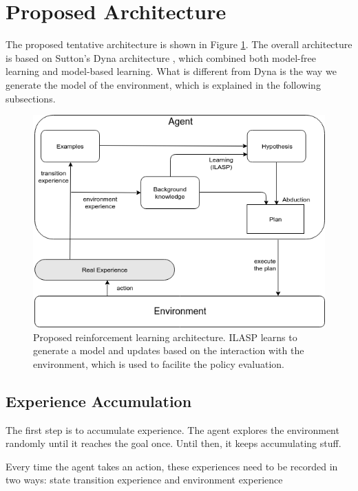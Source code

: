 \section{Proposed Architecture}
\label{proposed_architecture_section}

The proposed tentative architecture is shown in Figure \ref{proposed_architecture}. The overall architecture is based on Sutton's Dyna architecture \cite{Sutton1990}, which combined both model-free learning and model-based learning. What is different from Dyna is the way we generate the model of the environment, which is explained in the following subsections.

\begin{figure}[!htb]
\centering
\includegraphics[width=1.0\textwidth]{./figures/architecture}
\caption{Proposed reinforcement learning architecture. ILASP learns to generate a model and updates based on the interaction with the environment, which is used to facilite the policy evaluation. }
\label{proposed_architecture}
\end{figure}

\subsection{Experience Accumulation}
\label{experience_accumulation}

The first step is to accumulate experience. The agent explores the environment randomly until it reaches the goal once. Until then, it keeps accumulating stuff. 

Every time the agent takes an action, these experiences need to be recorded in two ways: state transition experience and environment experience

